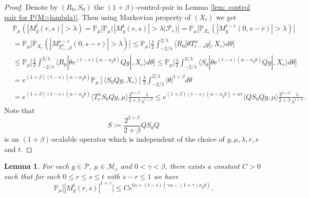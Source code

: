 \documentclass[12pt,oneside,english]{amsart}
\theoremstyle{plain}
\newtheorem{lem}[thm]{Lemma}
\theoremstyle{definition}
\numberwithin{equation}{section}
\newcommand{\added}[1]{{\color{blue}#1}}\newcommand{\deleted}[1]{{\color{red}#1}}
\begin{document}
\added{
\begin{proof}
    Denote by $(R_0,S_0)$ the $(1+\beta)$-control-pair in Lemma \ref{lem: control pair for P(M>lambda)}.
    Then using Markovian property of $(X_t)$ we get
\begin{align}
    &\mathbb P_{\mu}(|M^t_g(r,s)|>\lambda)
    = \mathbb P_\mu \big[\mathbb P_\mu\big(|M_g^t(r,s)|> \lambda\big| \mathscr F_r\big)\big]
    = \mathbb P_\mu \big[\mathbb P_{X_r}(|M^{t-r}_g(0,s-r)|> \lambda)\big]
    \\&= \mathbb P_\mu \big[\mathbb P_{X_r}(|M^{s-r}_{T^\alpha_{t-s}g}(0,s-r)|> \lambda)\big]
    \leq \mathbb P_\mu \Big[ \frac{\lambda}{2}\int_{-2/\lambda}^{2/\lambda}\langle R_0|\theta T^\alpha_{t-s}g|,X_r\rangle d\theta \Big]
    \\&\leq \mathbb P_\mu \Big[ \frac{\lambda}{2}\int_{-2/\lambda}^{2/\lambda}\langle R_0|\theta e^{(t-s)(\alpha- \kappa_gb)}Qg|,X_r\rangle d\theta \Big]
    \leq \mathbb P_\mu \Big[ \frac{\lambda}{2}\int_{-2/\lambda}^{2/\lambda}\langle S_0|\theta e^{(t-s)(\alpha- \kappa_gb)}Qg|,X_r\rangle d\theta \Big]
    \\& = e^{(1+\beta)(t-s)(\alpha- \kappa_gb)} \mathbb P_\mu [ \langle S_0Qg,X_r\rangle ] \frac{\lambda}{2}\int_{-2/\lambda}^{2/\lambda}|\theta|^{1+\beta}d\theta
    \\& = e^{(1+\beta)(t-s)(\alpha- \kappa_gb)} \langle T_r^\alpha S_0Qg,\mu\rangle  \frac{2^{2+\beta}}{2+\beta}\frac{1}{\lambda^{1+\beta}}
    \leq e^{(1+\beta)(t-s)(\alpha- \kappa_gb)+ \alpha r} \langle QS_0Qg,\mu\rangle  \frac{2^{2+\beta}}{2+\beta}\frac{1}{\lambda^{1+\beta}}.
\end{align}
    Note that
\[
    S := \frac{2^{2+\beta}}{2+\beta}QS_0Q
\]
    is an $(1+\beta)$-scalable operator which is independent of the choice of $g,\mu, \lambda, r, s$ and $t$.
\end{proof}
}
\added{
\begin{lem}
    For each $g\in \mathcal P$, $\mu \in \mathcal M_c$ and $0<\gamma < \beta$, there exists a constant $C>0$ such that for each $0\leq r\leq s\leq t$ with $s-r \leq 1$ we have
\[
    \mathbb P_\mu\big[|M^t_g(r,s)|^{1+\gamma}\big]
    \leq C e^{t\alpha+(t-s) (\gamma\alpha- (1+\gamma)\kappa_gb)}.
\]
\end{lem}
}
\end{document}
